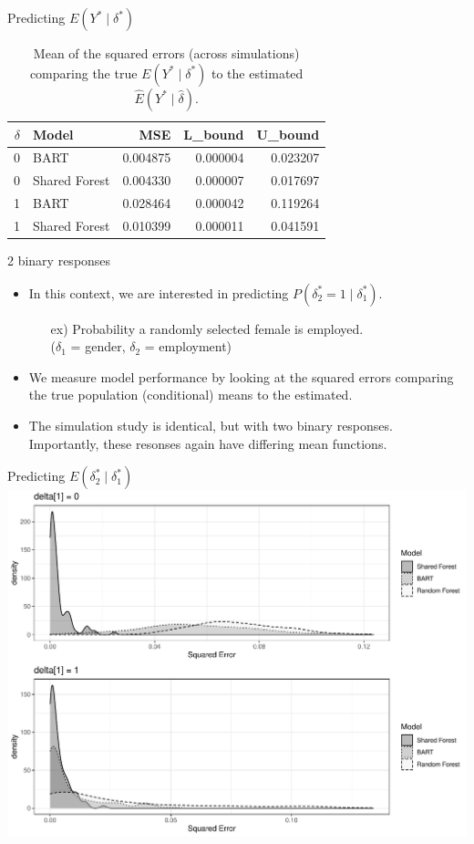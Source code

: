 \documentclass{beamer}
\begin{document}
\begin{frame}{Predicting $E(Y^* \mid \delta^*)$ }

\begin{table}[ht]
\centering
\begin{tabular}{rlrrr}
  \hline
$\delta$ & Model & MSE & L\_bound & U\_bound \\ 
  \hline
0 & BART & 0.004875 & 0.000004 & 0.023207 \\ 
  0 & Shared Forest & 0.004330 & 0.000007 & 0.017697 \\ 
  1 & BART & 0.028464 & 0.000042 & 0.119264 \\ 
  1 & Shared Forest & 0.010399 & 0.000011 & 0.041591 \\ 
   \hline
\end{tabular}
\caption{\label{tab:mse} Mean of the squared errors (across simulations) comparing the true $E(Y^* \mid \delta^*)$ to the estimated $\hat{E}(Y^* \mid \hat{\delta})$.}
\end{table}

\end{frame}




\begin{frame}{2 binary responses}
\begin{itemize}
\item In this context, we are interested in predicting $P(\delta^*_2=1 \mid \delta^*_1)$.
\begin{itemize}
\item[ex)] Probability a randomly selected female is employed. \\($\delta_1$ = gender, $\delta_2$ = employment)
\end{itemize}
\item We measure model performance by looking at the squared errors comparing the true population (conditional) means to the estimated. 

\item The simulation study is identical, but with two binary responses. Importantly, these resonses again have differing mean functions. 
\end{itemize}
\end{frame}

\begin{frame}{Predicting $E(\delta_2^* \mid \delta_1^*)$ }
\includegraphics[width = .9\linewidth]{binary_sim_results.pdf}
\end{frame}
\end{document}
